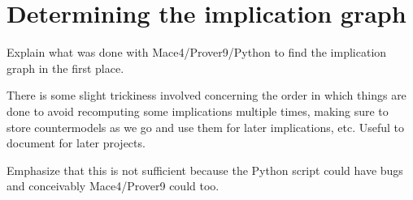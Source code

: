 \section{Determining the implication graph}

Explain what was done with Mace4/Prover9/Python to find the implication graph in the first place.

There is some slight trickiness involved concerning the order in which things are done to avoid recomputing some implications multiple times, making sure to store countermodels as we go and use them for later implications, etc.  Useful to document for later projects.

Emphasize that this is not sufficient because the Python script could have bugs and conceivably Mace4/Prover9 could too.
